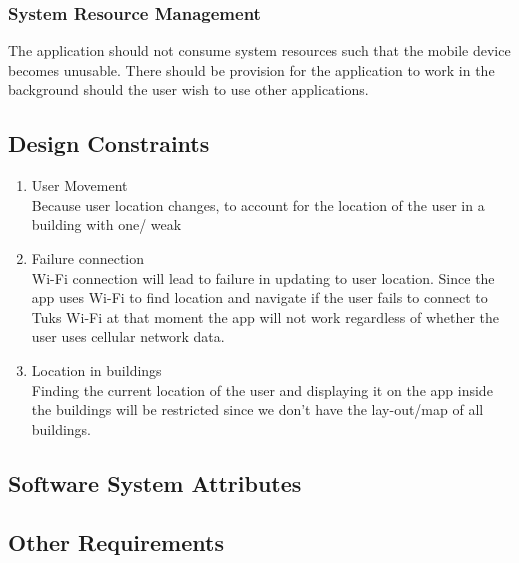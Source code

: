 \documentclass[a4paper,10pt]{article}
\begin{document}
               \subsubsection{System Resource Management}
   The application should not consume system resources such that the mobile device becomes unusable. There should be provision for the application to work in the background should the user wish to use other applications.
   
	\subsection{Design Constraints}
		\begin{enumerate}
		\item 	User Movement \\
Because user location changes, to account for the location of the user in a building with one/ weak 
			
		\item 	Failure connection \\
Wi-Fi connection will lead to failure in updating to user location. Since the app uses Wi-Fi to find location and navigate if the user fails to connect to Tuks Wi-Fi at that moment the app will not work regardless of whether the user uses cellular network data.	
					
		\item Location in buildings \\
Finding the current location of the user and displaying it on the app inside the buildings will be restricted since we don't have the lay-out/map of all buildings.	
		\end{enumerate}				

	\subsection{Software System Attributes}
	\subsection{Other Requirements}
\end{document}
